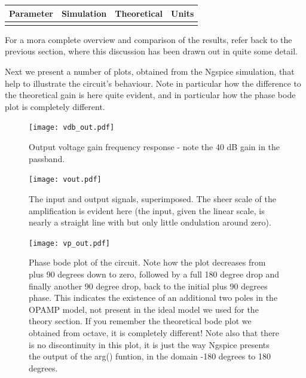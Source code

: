 \hfill
 \parbox{1\linewidth}{
  \centering
  \begin{tabular}{|l|l|l|r|}
    \hline    
    {\bf Parameter} & {\bf Simulation} & {\bf Theoretical } & {\bf Units }\\ \hline
    
  \label{tab:results2}
  \end{tabular}
  }
  
  For a mora complete overview and comparison of the results, refer back to the previous section, where this discussion has been drawn out in quite some detail.

  
Next we present a number of plots, obtained from the Ngspice simulation, that help to illustrate the circuit's behaviour. Note in particular how the difference to the theoretical gain is here quite evident, and in particular how the phase bode plot is completely different.
  
\par
\vspace{-4cm}
\begin{figure}[H] \centering
\texttt{[image: vdb\_out.pdf]}
\vspace{-1cm}
\caption{Output voltage gain frequency response - note the 40 dB gain in the passband.}
\label{fig:gain_sim}
\end{figure}


\begin{figure}[H] \centering
\texttt{[image: vout.pdf]}
\caption{The input and output signals, superimposed. The sheer scale of the amplification is evident here (the input, given the linear scale, is nearly a straight line with but only little ondulation around zero).}
\label{fig:In_imp}
\end{figure}
\vspace{-3cm}


\begin{figure}[H] \centering
\texttt{[image: vp\_out.pdf]}
\caption{Phase bode plot of the circuit. Note how the plot decreases from plus 90 degrees down to zero, followed by a full 180 degree drop and finally another 90 degree drop, back to the initial plus 90 degrees phase. This indicates the existence of an additional two poles in the OPAMP model, not present in the ideal model we used for the theory section. If you remember the theoretical bode plot we obtained from octave, it is completely different! Note also that there is no discontinuity in this plot, it is just the way Ngspice presents the output of the arg() funtion, in the domain -180 degrees to 180 degrees.}
\label{fig:out_imp}
\end{figure}
\vspace{-3cm}


\pagebreak
